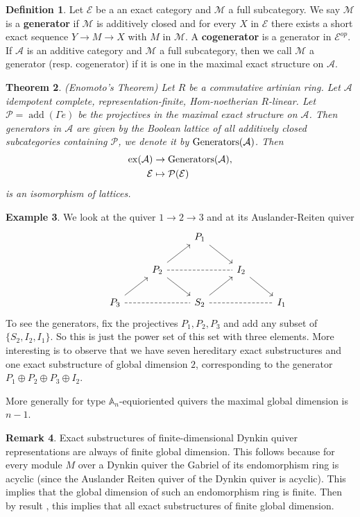 \documentclass[11pt,a4paper]{amsart}
\theoremstyle{plain}
\newtheorem{thm}{Theorem}[section]
\theoremstyle{definition}
\newtheorem{dfn}[thm]{Definition}
\newtheorem{exa}[thm]{Example}
\newtheorem{rem}[thm]{Remark}
\newcommand{\mcA}{\mathcal{A}}
\newcommand{\mcE}{\mathcal{E}}
\newcommand{\mcM}{\mathcal{M}}
\newcommand{\mcP}{\mathcal{P}}
\DeclareMathOperator{\exact}{ex}
\DeclareMathOperator{\add}{add}
\begin{document}
\begin{dfn}
Let $\mcE$ be a an exact category and $\mcM$ a full subcategory. We say $\mcM$ is a \textbf{generator} if $\mcM$ is additively closed and for every $X$ in $\mcE$ there exists a short exact sequence $Y\to M \to X$ with $M$ in $\mcM$. A \textbf{cogenerator} is a generator in $\mcE^{op}$. \\
If $\mcA$ is an additive category and $\mcM$ a full subcategory, then we call $\mcM$ a generator (resp. cogenerator) if it is one in the maximal exact structure on $\mcA$. 
\end{dfn} 

\begin{thm} \label{Enomoto-ThmOne}(Enomoto's Theorem)
Let $R$ be a commutative artinian ring. 
Let $\mcA$ idempotent complete, representation-finite, Hom-noetherian $R$-linear. Let $\mcP=\add (\Gamma e)$ be the projectives in the maximal exact structure on $\mcA$. Then generators in $\mcA$ are given by the Boolean lattice of all additively closed subcategories containing $\mcP$, we denote it by $\rm{Generators} (\mcA)$.
Then \[
\begin{aligned}
\exact (\mcA) &\to \rm{Generators} (\mcA), \\
\mcE &\mapsto \mcP (\mcE)
\end{aligned}
\] is an isomorphism of lattices. 
\end{thm}

\begin{exa}
We look at the quiver $1\to 2 \to 3$ and at its Auslander-Reiten quiver 
\[
\begin{tikzcd}
\  & & & P_1 \arrow[rd] & &     \\
   & & P_2 \arrow[ru] \arrow[rd] \arrow[rr, dashed, dash] &  & I_2 \arrow[rd] &     \\
   & P_3 \arrow[ru] \arrow[rr, dashed, dash] &  & S_2 \arrow[ru] \arrow[rr, dashed, dash] &   & I_1
\end{tikzcd}
\]
To see the generators, fix the projectives $P_1,P_2,P_3$ and add any subset of $\{S_2,I_2,I_1\}$. So this is just the power set of this set with three elements. More interesting is to observe that we have seven hereditary exact substructures and one exact substructure of global dimension $2$, corresponding to the generator $P_1\oplus P_2\oplus P_3\oplus I_2$. 
\end{exa}

More generally for type $\mathbb{A}_n$-equioriented quivers the maximal global dimension is $n-1$. 
\begin{rem}
Exact substructures of finite-dimensional Dynkin quiver representations are always of finite global dimension. This follows because for every module $M$ over a Dynkin quiver the Gabriel of its endomorphism ring is acyclic (since the Auslander Reiten quiver of the Dynkin quiver is acyclic). This implies that the global dimension of such an endomorphism ring is finite. Then by result \cite{ASoII}, 
this implies that all exact substructures of finite global dimension. 
\end{rem}
\end{document}
